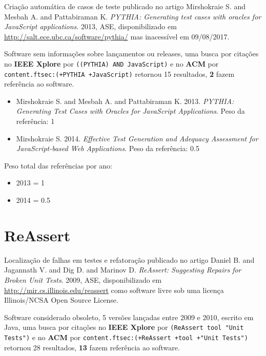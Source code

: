 Criação automática de casos de teste
publicado no artigo
Mirshokraie S. and Mesbah A. and Pattabiraman K.
{\it PYTHIA: Generating test cases with oracles for JavaScript applications}.
2013,
ASE,
disponibilizado em \url{http://salt.ece.ubc.ca/software/pythia/}
mas inacessível em 09/08/2017.

Software sem informações sobre lançamentos ou releases,
uma busca por citações no {\bf IEEE Xplore} por
\texttt{((PYTHIA) AND JavaScript)}
e no {\bf ACM} por
\texttt{content.ftsec:(+PYTHIA +JavaScript)}
retornou
15 resultados,
{\bf 2} fazem referência ao software.

\begin{itemize}
\item Mirshokraie S. and Mesbah A. and Pattabiraman K.
      2013.
      {\it PYTHIA: Generating Test Cases with Oracles for JavaScript Applications}.
      Peso da referência: 1
\item Mirshokraie S.
      2014.
      {\it Effective Test Generation and Adequacy Assessment for JavaScript-based Web Applications}.
      Peso da referência: 0.5
\end{itemize}

Peso total das referências por ano:

\begin{itemize}
\item 2013 = 1
\item 2014 = 0.5
\end{itemize}


\section{ReAssert}

Localização de falhas em testes e refatoração
publicado no artigo
Daniel B. and Jagannath V. and Dig D. and Marinov D.
{\it ReAssert: Suggesting Repairs for Broken Unit Tests}.
2009,
ASE,
disponibilizado em \url{http://mir.cs.illinois.edu/reassert}
como software livre
sob uma licença Illinois/NCSA Open Source License.

Software considerado obsoleto,
5 versões lançadas
entre 2009 e 2010,
escrito em Java,
uma busca por citações no {\bf IEEE Xplore} por
\texttt{(ReAssert tool "Unit Tests")}
e no {\bf ACM} por
\texttt{content.ftsec:(+ReAssert +tool +"Unit Tests")}
retornou
28 resultados,
{\bf 13} fazem referência ao software.

